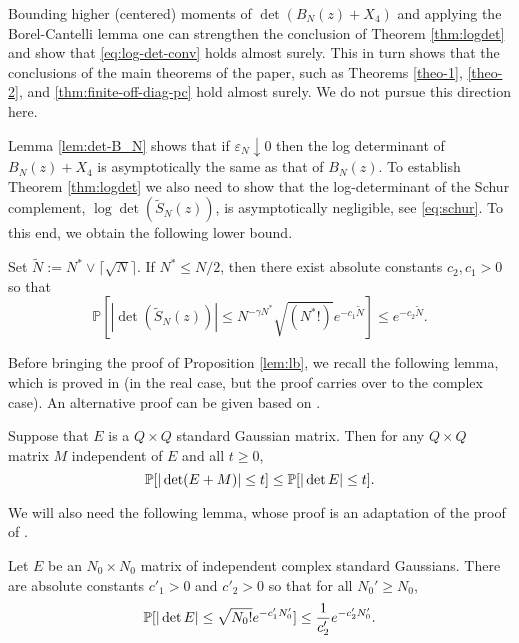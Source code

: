 \documentclass{amsart}
\numberwithin{equation}{section}
\def\corA{}
\def\corAB{}
\def\corOZ{}
\begin{document}
\begin{remark}
  \corAB{Bounding higher (centered) moments of $\det (B_N(z)+X_4)$ and applying}
  \corOZ{the}
  \corAB{Borel-Cantelli lemma one can strengthen the conclusion of Theorem \ref{thm:logdet}} \corOZ{and show}
  \corAB{that \eqref{eq:log-det-conv} holds almost surely. This in turn shows that the conclusions of the main theorems of the paper, such as Theorems \ref{theo-1}, \ref{theo-2}, and \ref{thm:finite-off-diag-pc} hold almost surely. We do not pursue this direction here.}
\end{remark}

Lemma \ref{lem:det-B_N} shows that if $\varepsilon_N \downarrow 0$ then
the log determinant of $B_N(z)+X_4$ is asymptotically the
same as that of $B_N(z)$.
To establish Theorem \ref{thm:logdet} we also need to show
that the log-determinant of the Schur complement,
$\log \det(\widetilde{S}_N(z))$,
is asymptotically negligible,
see \eqref{eq:schur}.  To this end, we obtain the following
lower bound.
\begin{proposition} \label{lem:lb}
 Set
  $\widetilde{N}:= N^* \vee \corAB{\lceil \sqrt{N}\rceil}$. %
 If $N^* \le N/2$, then there exist absolute constants $c_2, c_1 > 0$ so that
  \begin{equation}\label{eq:schur-det-lbd}
    \mathbb{P}[|\det(\widetilde{S}_N(z))| \leq N^{-\gamma N^*}\sqrt{ ({N}^*!)} \corA{e^{-c_1\widetilde{N}}}] \leq \corA{e^{-c_2\widetilde{N}}}.
  \end{equation}
 \end{proposition}
 Before bringing the proof of Proposition \ref{lem:lb}, we recall the
following lemma, which
is proved in \cite[Lemma 4.4]{FPZ}
(in the real case, but the proof carries over to the complex case).
An alternative
proof can be given based on \cite[Theorem 4]{Sn}.
\begin{lemma}
  \label{lem:sd}
  Suppose that $E$ is a $Q \times Q$ standard Gaussian matrix.  Then for any $Q \times Q$ matrix $M$ independent of $E$ and all $t \geq 0,$
  \[
    \P[ |\det(E + M)| \leq t] \leq \P[ |\det E| \leq t].
  \]
\end{lemma}
We will also need the following lemma, whose
proof is an adaptation of the proof of \cite[Lemma 2.5]{FPZ}.
\begin{lemma}
  \label{lem:Gdet_lb}
  Let $E$ be an $N_0\times N_0$ matrix of
  independent complex standard Gaussians.
  There are absolute constants $c'_1 >0$ and $c'_2>0$ so that for all
  $N_0' \geq N_0$,
  \[
    \P[
      |\det E| \leq \sqrt{N_0!} e^{-c'_1 N_0'}
    ] \leq \frac{1}{c'_2}e^{-c'_2N_0'}.
  \]
\end{lemma}
\end{document}
